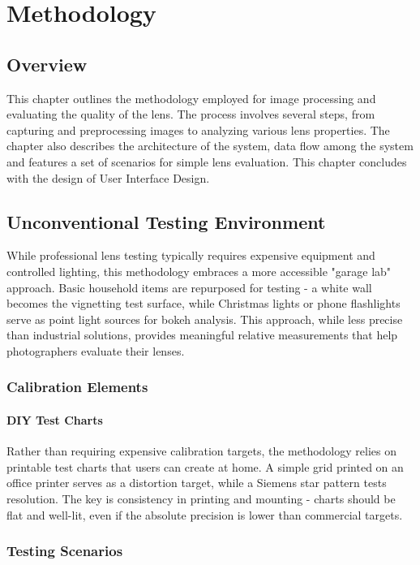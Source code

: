 

\chapter{Methodology}

\section{Overview}
This chapter outlines the methodology employed for image processing and evaluating the quality of the lens. The process involves several steps, from capturing and preprocessing images to analyzing various lens properties. The chapter also describes the architecture of the system, data flow among the system and features a set of scenarios for simple lens evaluation. This chapter concludes with the design of User Interface Design.

\section{Unconventional Testing Environment}
While professional lens testing typically requires expensive equipment and controlled lighting, this methodology embraces a more accessible "garage lab" approach. Basic household items are repurposed for testing - a white wall becomes the vignetting test surface, while Christmas lights or phone flashlights serve as point light sources for bokeh analysis. This approach, while less precise than industrial solutions, provides meaningful relative measurements that help photographers evaluate their lenses.

\subsection{Calibration Elements}
\subsubsection{DIY Test Charts}
Rather than requiring expensive calibration targets, the methodology relies on printable test charts that users can create at home. A simple grid printed on an office printer serves as a distortion target, while a Siemens star pattern tests resolution. The key is consistency in printing and mounting - charts should be flat and well-lit, even if the absolute precision is lower than commercial targets.

\subsection{Testing Scenarios}

